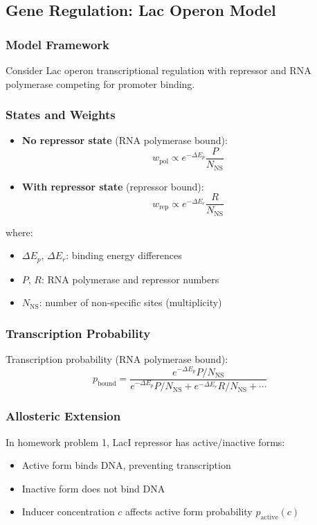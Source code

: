 \documentclass[12pt]{article}
\begin{document}
\subsection{Gene Regulation: Lac Operon Model}

\subsubsection{Model Framework}
Consider Lac operon transcriptional regulation with repressor and RNA polymerase competing for promoter binding.

\subsubsection{States and Weights}
\begin{itemize}
    \item \textbf{No repressor state} (RNA polymerase bound):
    \begin{equation}
    w_{\text{pol}} \propto e^{-\Delta E_p} \frac{P}{N_{\text{NS}}}
    \end{equation}
    
    \item \textbf{With repressor state} (repressor bound):
    \begin{equation}
    w_{\text{rep}} \propto e^{-\Delta E_r} \frac{R}{N_{\text{NS}}}
    \end{equation}
\end{itemize}
where:
\begin{itemize}
    \item $\Delta E_p$, $\Delta E_r$: binding energy differences
    \item $P$, $R$: RNA polymerase and repressor numbers
    \item $N_{\text{NS}}$: number of non-specific sites (multiplicity)
\end{itemize}

\subsubsection{Transcription Probability}
Transcription probability (RNA polymerase bound):
\begin{equation}
p_{\text{bound}} = \frac{e^{-\Delta E_p} P / N_{\text{NS}}}{e^{-\Delta E_p} P / N_{\text{NS}} + e^{-\Delta E_r} R / N_{\text{NS}} + \cdots}
\end{equation}

\subsubsection{Allosteric Extension}
In homework problem 1, LacI repressor has active/inactive forms:
\begin{itemize}
    \item Active form binds DNA, preventing transcription
    \item Inactive form does not bind DNA
    \item Inducer concentration $c$ affects active form probability $p_{\text{active}}(c)$
\end{itemize}
\end{document}
